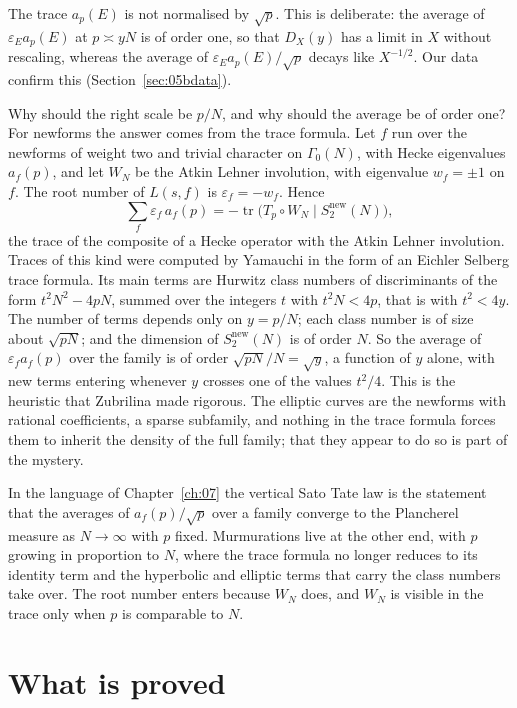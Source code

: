 The trace $a_p(E)$ is not normalised by $\sqrt p$. This is deliberate: the average of $\varepsilon_Ea_p(E)$ at $p\asymp yN$ is of order one, so that $D_X(y)$ has a limit in $X$ without rescaling, whereas the average of $\varepsilon_Ea_p(E)/\sqrt p$ decays like $X^{-1/2}$. Our data confirm this (Section~\ref{sec:05bdata}).

Why should the right scale be $p/N$, and why should the average be of order one? For newforms the answer comes from the trace formula. Let $f$ run over the newforms of weight two and trivial character on $\Gamma_0(N)$, with Hecke eigenvalues $a_f(p)$, and let $W_N$ be the Atkin Lehner involution, with eigenvalue $w_f=\pm1$ on $f$. The root number of $L(s,f)$ is $\varepsilon_f=-w_f$. Hence
\[
\sum_f\varepsilon_f\,a_f(p)=-\operatorname{tr}\bigl(T_p\circ W_N\mid S_2^{\mathrm{new}}(N)\bigr),
\]
the trace of the composite of a Hecke operator with the Atkin Lehner involution. Traces of this kind were computed by Yamauchi \cite{yamauchi1973} in the form of an Eichler Selberg trace formula. Its main terms are Hurwitz class numbers of discriminants of the form $t^2N^2-4pN$, summed over the integers $t$ with $t^2N<4p$, that is with $t^2<4y$. The number of terms depends only on $y=p/N$; each class number is of size about $\sqrt{pN}$; and the dimension of $S_2^{\mathrm{new}}(N)$ is of order $N$. So the average of $\varepsilon_fa_f(p)$ over the family is of order $\sqrt{pN}/N=\sqrt y$, a function of $y$ alone, with new terms entering whenever $y$ crosses one of the values $t^2/4$. This is the heuristic that Zubrilina made rigorous. The elliptic curves are the newforms with rational coefficients, a sparse subfamily, and nothing in the trace formula forces them to inherit the density of the full family; that they appear to do so is part of the mystery.

\begin{remark}
In the language of Chapter~\ref{ch:07} the vertical Sato Tate law is the statement that the averages of $a_f(p)/\sqrt p$ over a family converge to the Plancherel measure as $N\to\infty$ with $p$ fixed. Murmurations live at the other end, with $p$ growing in proportion to $N$, where the trace formula no longer reduces to its identity term and the hyperbolic and elliptic terms that carry the class numbers take over. The root number enters because $W_N$ does, and $W_N$ is visible in the trace only when $p$ is comparable to $N$.
\end{remark}

\section{What is proved}\label{sec:05blit}

